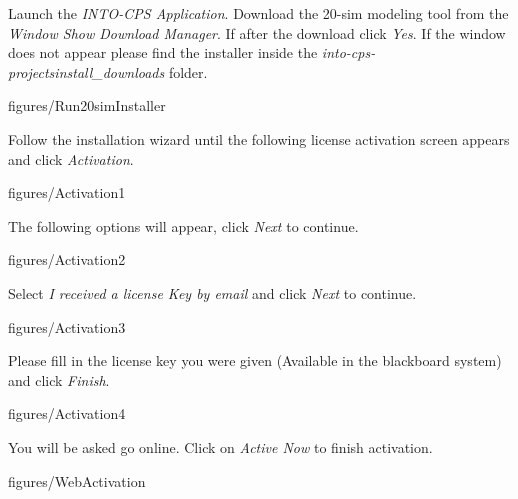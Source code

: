 \documentclass[11pt,a4paper]{../tutorial}
\begin{document}
\begin{instructions} 

\item Launch the \emph{INTO-CPS Application}. Download the 20-sim modeling tool from the  \emph{Window \menusep Show Download Manager}. If after the download click \emph{Yes}. If the window does not appear please find the installer inside the \emph{into-cps-projects\pathsep install\_downloads} folder.

\begin{annotation}[width=0.85\linewidth]{figures/Run20simInstaller}
\end{annotation}

\newpage

\item Follow the installation wizard until the following license activation screen appears and click \emph{Activation}.

\begin{annotation}[width=0.5\linewidth]{figures/Activation1}
\end{annotation}
 

\item The following options will appear, click \emph{Next} to continue. 

\begin{annotation}[width=0.5\linewidth]{figures/Activation2}
\end{annotation}

\item Select \emph{I received a license Key by email} and click \emph{Next} to continue. 

\begin{annotation}[width=0.5\linewidth]{figures/Activation3}
\end{annotation}

\newpage 
\item Please fill in the license key you were given (Available in the blackboard system) and click \emph{Finish}.
	
\begin{annotation}[width=0.5\linewidth]{figures/Activation4}
\end{annotation}

\item You will be asked go online. Click on \emph{Active Now} to finish activation. 
	
\begin{annotation}[width=0.5\linewidth]{figures/WebActivation}
\end{annotation}

\end{instructions}
\end{document}
